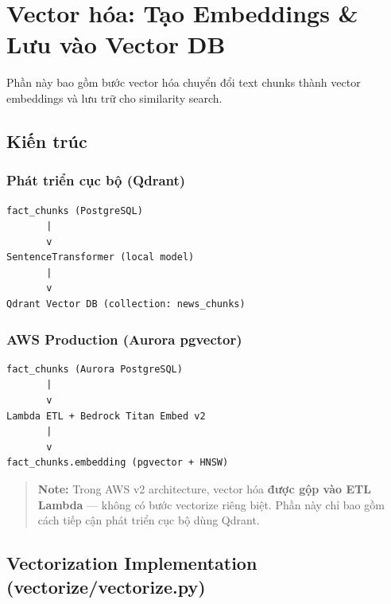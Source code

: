 \hypertarget{vector-huxf3a-tux1ea1o-embeddings-lux1b0u-vuxe0o-vector-db}{%
\section{Vector hóa: Tạo Embeddings \& Lưu vào Vector
DB}}

Phần này bao gồm bước vector hóa chuyển đổi text chunks thành vector
embeddings và lưu trữ cho similarity search.

\hypertarget{kiux1ebfn-truxfac}{%
\subsection{Kiến trúc}}

\hypertarget{phuxe1t-triux1ec3n-cux1ee5c-bux1ed9-qdrant}{%
\subsubsection{Phát triển cục bộ
(Qdrant)}}

\begin{verbatim}
fact_chunks (PostgreSQL)
       |
       v
SentenceTransformer (local model)
       |
       v
Qdrant Vector DB (collection: news_chunks)
\end{verbatim}

\hypertarget{aws-production-aurora-pgvector}{%
\subsubsection{AWS Production (Aurora
pgvector)}}

\begin{verbatim}
fact_chunks (Aurora PostgreSQL)
       |
       v
Lambda ETL + Bedrock Titan Embed v2
       |
       v
fact_chunks.embedding (pgvector + HNSW)
\end{verbatim}

\begin{quote}
\textbf{Note:} Trong AWS v2 architecture, vector hóa \textbf{được gộp
vào ETL Lambda} --- không có bước vectorize riêng biệt. Phần này chỉ bao
gồm cách tiếp cận phát triển cục bộ dùng Qdrant.
\end{quote}

\hypertarget{vectorization-implementation-vectorizevectorize.py}{%
\subsection{Vectorization Implementation
(vectorize/vectorize.py)}}

